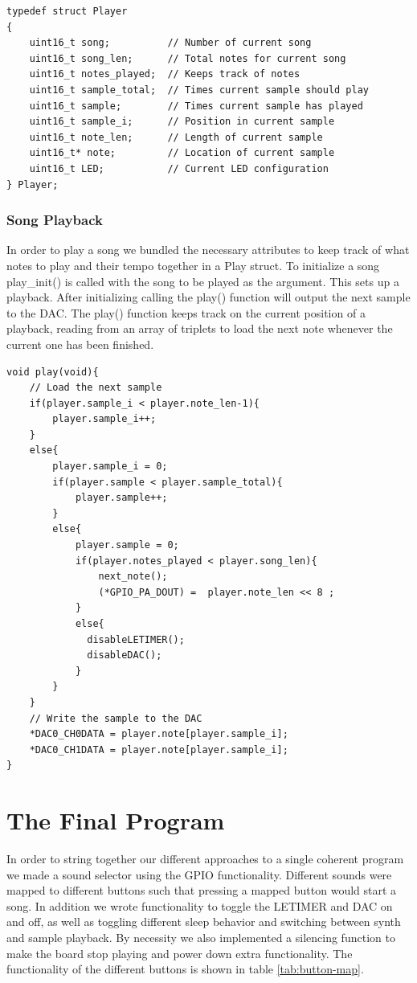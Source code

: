 \noindent\begin{minipage}{\textwidth}
\begin{lstlisting}
typedef struct Player
{
	uint16_t song;			// Number of current song
	uint16_t song_len;		// Total notes for current song
	uint16_t notes_played;	// Keeps track of notes
	uint16_t sample_total;	// Times current sample should play	
	uint16_t sample;		// Times current sample has played
	uint16_t sample_i;		// Position in current sample 
	uint16_t note_len;		// Length of current sample
	uint16_t* note;			// Location of current sample
	uint16_t LED;			// Current LED configuration
} Player;
\end{lstlisting}
\end{minipage}

\subsubsection{Song Playback}
In order to play a song we bundled the necessary attributes to keep track of what notes to play and their tempo together in a Play struct. To initialize a song play\_init() is called with the song to be played as the argument. This sets up a playback. After initializing calling the play() function will output the next sample to the DAC.
The play() function keeps track on the current position of a playback, reading from an array of triplets to load the next note whenever the current one has been finished.

\noindent\begin{minipage}{\textwidth}
\begin{lstlisting}
void play(void){
	// Load the next sample
	if(player.sample_i < player.note_len-1){			
		player.sample_i++;								
	}
	else{								
		player.sample_i = 0;
		if(player.sample < player.sample_total){
   			player.sample++;				
		}
		else{							
			player.sample = 0;
			if(player.notes_played < player.song_len){
				next_note();
				(*GPIO_PA_DOUT) =  player.note_len << 8 ;		
			}			 
			else{
			  disableLETIMER();
			  disableDAC();
			}
		}
	}
	// Write the sample to the DAC
	*DAC0_CH0DATA = player.note[player.sample_i];
	*DAC0_CH1DATA = player.note[player.sample_i];
}
\end{lstlisting}
\end{minipage}

\section{The Final Program}
In order to string together our different approaches to a single coherent program we made a sound selector using the GPIO functionality. Different sounds were mapped to different buttons such that pressing a mapped button would start a song. In addition we wrote functionality to toggle the LETIMER and DAC on and off, as well as toggling different sleep behavior and switching between synth and sample playback. By necessity we also implemented a silencing function to make the board stop playing and power down extra functionality. The functionality of the different buttons is shown in table \ref{tab:button-map}.

